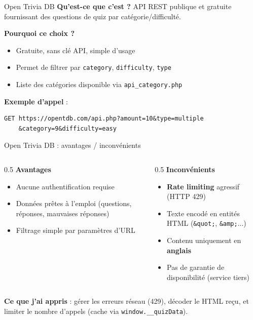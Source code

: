\documentclass[aspectratio=169]{beamer}
\begin{document}
\begin{frame}[fragile]{Open Trivia DB}
  \textbf{Qu'est-ce que c'est ?} API REST publique et gratuite fournissant des questions de quiz par catégorie/difficulté.

  \vspace{0.3cm}
  \textbf{Pourquoi ce choix ?}
  \begin{itemize}
    \item Gratuite, sans clé API, simple d'usage
    \item Permet de filtrer par \texttt{category}, \texttt{difficulty}, \texttt{type}
    \item Liste des catégories disponible via \texttt{api\_category.php}
  \end{itemize}

  \vspace{0.3cm}
  \textbf{Exemple d'appel} :
  \begin{lstlisting}
GET https://opentdb.com/api.php?amount=10&type=multiple
    &category=9&difficulty=easy
  \end{lstlisting}
\end{frame}

\begin{frame}{Open Trivia DB : avantages / inconvénients}
  \begin{columns}
    \begin{column}{0.5\textwidth}
      \textbf{Avantages}
      \begin{itemize}
        \item Aucune authentification requise
        \item Données prêtes à l'emploi (questions, réponses, mauvaises réponses)
        \item Filtrage simple par paramètres d'URL
      \end{itemize}
    \end{column}
    \begin{column}{0.5\textwidth}
      \textbf{Inconvénients}
      \begin{itemize}
        \item \textbf{Rate limiting} agressif (HTTP 429)
        \item Texte encodé en entités HTML (\texttt{\&quot;}, \texttt{\&amp;}...)
        \item Contenu uniquement en \textbf{anglais}
        \item Pas de garantie de disponibilité (service tiers)
      \end{itemize}
    \end{column}
  \end{columns}

  \vspace{0.3cm}
  \textbf{Ce que j'ai appris} : gérer les erreurs réseau (429), décoder le HTML reçu, et limiter le nombre d'appels (cache via \texttt{window.\_\_quizData}).
\end{frame}
\end{document}
